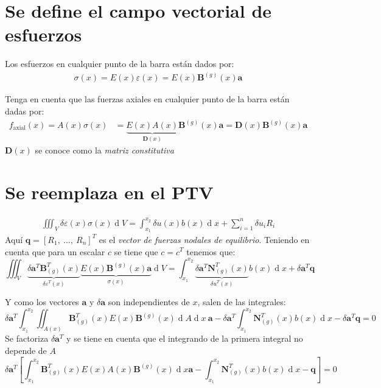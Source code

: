 \documentclass[12pt,letterpaper,landscape]{article}
\newcommand{\ve}[1]{{\boldsymbol{#1}}}
\newcommand{\ma}[1]{{\boldsymbol{#1}}}
\newcommand{\dd}{\operatorname{d} \!}
\begin{document}
\section{Se define el campo vectorial de esfuerzos}
Los esfuerzos en cualquier punto de la barra están dados por:
\begin{align}
\sigma(x) = E(x) \varepsilon(x) = E(x) \ma{B}^{(g)}(x) \ve{a}
\end{align}

Tenga en cuenta que las fuerzas axiales en cualquier punto de la barra están dadas por:
\begin{align}
f_{\text{axial}}(x) = A(x) \sigma(x) &= \underbrace{E(x) A(x)}_{\ma{D}(x)} \ma{B}^{(g)}(x)
\ve{a} = \ma{D}(x) \ma{B}^{(g)}(x) \ve{a}
\end{align}
$\ma{D}(x)$ se conoce como la \emph{matriz constitutiva}

\newpage
\section{Se reemplaza en el PTV}
\begin{align}
\iiint_{V} \delta\varepsilon(x) \sigma(x) \dd V = \int_{x_1}^{x_2} \delta u(x) b(x) \dd x + \sum_{i=1}^n \delta u_i R_i
\end{align}
Aquí $\ve{q} = [R_1,\ \ldots,\ R_n]^T$ es el \emph{vector de fuerzas nodales de equilibrio}. Teniendo en cuenta que para un escalar $c$ se tiene que $c = c^T$ tenemos que:
\begin{equation}
\iiint_{V} \underbrace{\delta \ve{a}^T \ma{B}_{(g)}^T(x)}_{\delta\varepsilon^T(x)} \underbrace{E(x) \ma{B}^{(g)}(x) \ve{a}}_{\sigma(x)} \dd V = \int_{x_1}^{x_2} \underbrace{\delta \ve{a}^T \ma{N}_{(g)}^T(x)}_{\delta u^T(x)} b(x) \dd x +
\delta \ma{a}^T \ma{q}
\end{equation}

Y como los vectores $\ve{a}$ y $\delta \ve{a}$  son independientes de $x$, salen de las integrales:
\begin{equation}
\delta \ve{a}^T \int_{x_1}^{x_2} \iint_{A(x)}  \ma{B}_{(g)}^T(x) E(x) \ma{B}^{(g)}(x) \dd A \dd x\ \ve{a} - \delta \ve{a}^T \int_{x_1}^{x_2}  \ma{N}_{(g)}^T(x) b(x) \dd x 
- \delta \ma{a}^T \ma{q} = 0
\end{equation}
Se factoriza $\delta \ma{a}^T$ y se tiene en cuenta que el integrando de la primera integral no depende de $A$
\begin{equation}
\delta \ve{a}^T 
\left[ \int_{x_1}^{x_2} \ma{B}_{(g)}^T(x) E(x) A(x) \ma{B}^{(g)}(x) \dd x \ve{a}
%
- \int_{x_1}^{x_2}  \ma{N}_{(g)}^T(x) b(x) \dd x 
- \ma{q}\right] = 0
\end{equation}
\end{document}
